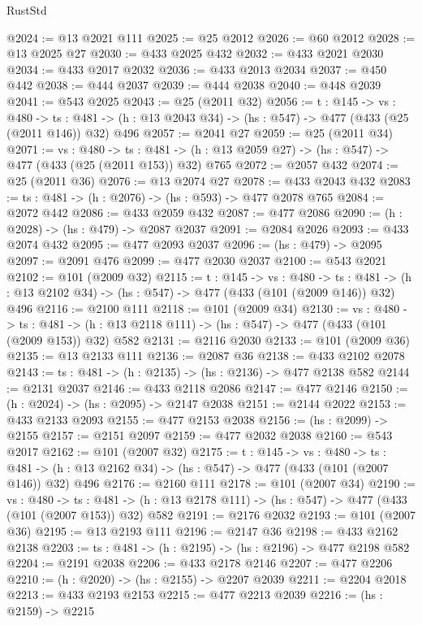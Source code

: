 \begin{lexlean}{RustStd}
\begin{coremodule}
{\begin{coremodule}
{{{{{{{@2024 := @13 @2021 @111
@2025 := @25 @2012
@2026 := @60 @2012
@2028 := @13 @2025 @27
@2030 := @433 @2025 @432
@2032 := @433 @2021 @2030
@2034 := @433 @2017 @2032
@2036 := @433 @2013 @2034
@2037 := @450 @442
@2038 := @444 @2037
@2039 := @444 @2038
@2040 := @448 @2039
@2041 := @543 @2025
@2043 := @25 (@2011 @32)
@2056 := {t : @145} ->
  {vs : @480} ->
  {ts : @481} -> (h : @13 @2043 @34) -> (hs : @547) -> @477 (@433 (@25 (@2011 @146)) @32) @496
@2057 := @2041 @27
@2059 := @25 (@2011 @34)
@2071 := {vs : @480} ->
  {ts : @481} -> (h : @13 @2059 @27) -> (hs : @547) -> @477 (@433 (@25 (@2011 @153)) @32) @765
@2072 := @2057 @432
@2074 := @25 (@2011 @36)
@2076 := @13 @2074 @27
@2078 := @433 @2043 @432
@2083 := {ts : @481} -> (h : @2076) -> (hs : @593) -> @477 @2078 @765
@2084 := @2072 @442
@2086 := @433 @2059 @432
@2087 := @477 @2086
@2090 := (h : @2028) -> (hs : @479) -> @2087 @2037
@2091 := @2084 @2026
@2093 := @433 @2074 @432
@2095 := @477 @2093 @2037
@2096 := (hs : @479) -> @2095
@2097 := @2091 @476
@2099 := @477 @2030 @2037
@2100 := @543 @2021
@2102 := @101 (@2009 @32)
@2115 := {t : @145} ->
  {vs : @480} ->
  {ts : @481} -> (h : @13 @2102 @34) -> (hs : @547) -> @477 (@433 (@101 (@2009 @146)) @32) @496
@2116 := @2100 @111
@2118 := @101 (@2009 @34)
@2130 := {vs : @480} ->
  {ts : @481} -> (h : @13 @2118 @111) -> (hs : @547) -> @477 (@433 (@101 (@2009 @153)) @32) @582
@2131 := @2116 @2030
@2133 := @101 (@2009 @36)
@2135 := @13 @2133 @111
@2136 := @2087 @36
@2138 := @433 @2102 @2078
@2143 := {ts : @481} -> (h : @2135) -> (hs : @2136) -> @477 @2138 @582
@2144 := @2131 @2037
@2146 := @433 @2118 @2086
@2147 := @477 @2146
@2150 := (h : @2024) -> (hs : @2095) -> @2147 @2038
@2151 := @2144 @2022
@2153 := @433 @2133 @2093
@2155 := @477 @2153 @2038
@2156 := (hs : @2099) -> @2155
@2157 := @2151 @2097
@2159 := @477 @2032 @2038
@2160 := @543 @2017
@2162 := @101 (@2007 @32)
@2175 := {t : @145} ->
  {vs : @480} ->
  {ts : @481} -> (h : @13 @2162 @34) -> (hs : @547) -> @477 (@433 (@101 (@2007 @146)) @32) @496
@2176 := @2160 @111
@2178 := @101 (@2007 @34)
@2190 := {vs : @480} ->
  {ts : @481} -> (h : @13 @2178 @111) -> (hs : @547) -> @477 (@433 (@101 (@2007 @153)) @32) @582
@2191 := @2176 @2032
@2193 := @101 (@2007 @36)
@2195 := @13 @2193 @111
@2196 := @2147 @36
@2198 := @433 @2162 @2138
@2203 := {ts : @481} -> (h : @2195) -> (hs : @2196) -> @477 @2198 @582
@2204 := @2191 @2038
@2206 := @433 @2178 @2146
@2207 := @477 @2206
@2210 := (h : @2020) -> (hs : @2155) -> @2207 @2039
@2211 := @2204 @2018
@2213 := @433 @2193 @2153
@2215 := @477 @2213 @2039
@2216 := (hs : @2159) -> @2215
}}}}}}}
\end{coremodule}}
\end{coremodule}
\end{lexlean}
